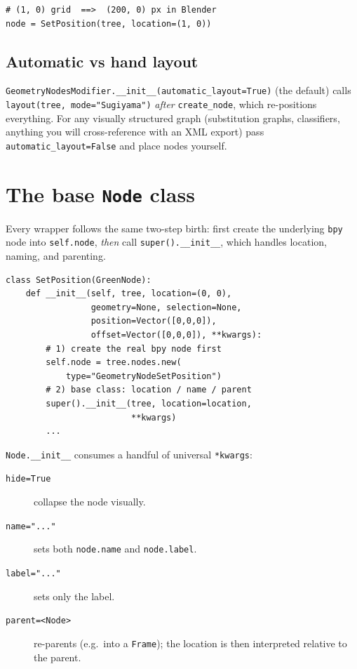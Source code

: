 \documentclass[10pt,a4paper,twocolumn]{article}
\newcommand{\code}[1]{\texttt{\small #1}}
\begin{document}
\begin{lstlisting}
# (1, 0) grid  ==>  (200, 0) px in Blender
node = SetPosition(tree, location=(1, 0))
\end{lstlisting}

\subsection{Automatic vs hand layout}

\code{GeometryNodesModifier.\_\_init\_\_(automatic\_layout=True)} (the
default) calls \code{layout(tree, mode="Sugiyama")} \emph{after}
\code{create\_node}, which re-positions everything. For any visually
structured graph (substitution graphs, classifiers, anything you will
cross-reference with an XML export) pass \code{automatic\_layout=False}
and place nodes yourself.

\section{The base \texttt{Node} class}

Every wrapper follows the same two-step birth: first create the underlying
\code{bpy} node into \code{self.node}, \emph{then} call
\code{super().\_\_init\_\_}, which handles location, naming, and parenting.

\begin{lstlisting}
class SetPosition(GreenNode):
    def __init__(self, tree, location=(0, 0),
                 geometry=None, selection=None,
                 position=Vector([0,0,0]),
                 offset=Vector([0,0,0]), **kwargs):
        # 1) create the real bpy node first
        self.node = tree.nodes.new(
            type="GeometryNodeSetPosition")
        # 2) base class: location / name / parent
        super().__init__(tree, location=location,
                         **kwargs)
        ...
\end{lstlisting}

\code{Node.\_\_init\_\_} consumes a handful of universal \code{**kwargs}:

\begin{description}
\item[\code{hide=True}] collapse the node visually.
\item[\code{name="..."}] sets both \code{node.name} and \code{node.label}.
\item[\code{label="..."}] sets only the label.
\item[\code{parent=<Node>}] re-parents (e.g.\ into a \code{Frame}); the
  location is then interpreted relative to the parent.
\end{description}
\end{document}
